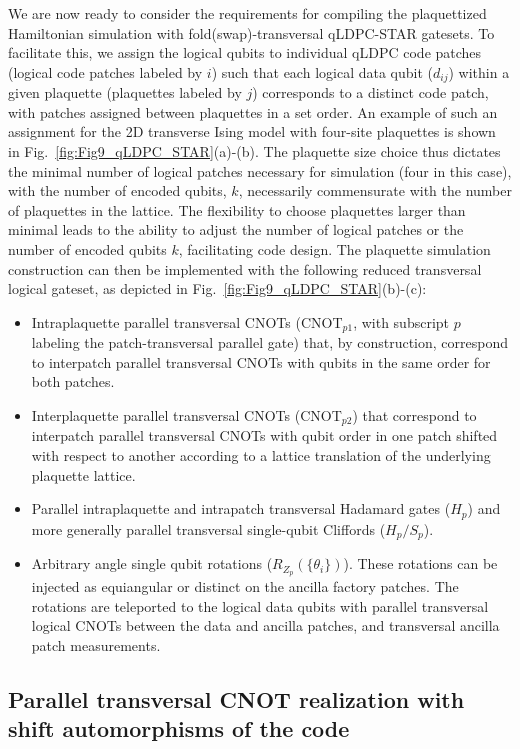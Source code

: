 \documentclass[aps, prx, reprint, superscriptaddress, longbibliography, floatfix]{revtex4-2}
\begin{document}
We are now ready to consider the requirements for compiling the plaquettized Hamiltonian simulation with fold(swap)-transversal qLDPC-STAR gatesets. To facilitate this, we assign the logical qubits to individual qLDPC code patches (logical code patches labeled by $i$) such that each logical data qubit ($d_{ij}$) within a given plaquette (plaquettes labeled by $j$) corresponds to a distinct code patch, with patches assigned between plaquettes in a set order. An example of such an assignment for the 2D transverse Ising model with four-site plaquettes is shown in Fig.~\ref{fig:Fig9_qLDPC_STAR}(a)-(b). The plaquette size choice thus dictates the minimal number of logical patches necessary for simulation (four in this case), with the number of encoded qubits, $k$, necessarily commensurate with the number of plaquettes in the lattice. The flexibility to choose plaquettes larger than minimal leads to the ability to adjust the number of logical patches or the number of encoded qubits $k$, facilitating code design. The plaquette simulation construction can then be implemented with the following reduced transversal logical gateset, as depicted in Fig.~\ref{fig:Fig9_qLDPC_STAR}(b)-(c):
\begin{itemize}
    \item Intraplaquette parallel transversal CNOTs (CNOT$_{p1}$, with subscript $p$ labeling the patch-transversal parallel gate) that, by construction, correspond to interpatch parallel transversal CNOTs with qubits in the same order for both patches.
    \item Interplaquette parallel transversal CNOTs (CNOT$_{p2}$) that correspond to interpatch parallel transversal CNOTs with qubit order in one patch shifted with respect to another according to a lattice translation of the underlying plaquette lattice.
    \item Parallel intraplaquette and intrapatch transversal Hadamard gates ($H_p$) and more generally parallel transversal single-qubit Cliffords ($H_p/S_p$).
    \item Arbitrary angle single qubit rotations ($R_{Z_p}(\{\theta_i\})$). These rotations can be injected as equiangular or distinct on the ancilla factory patches. The rotations are teleported to the logical data qubits with parallel transversal logical CNOTs between the data and ancilla patches,  and transversal ancilla patch measurements.
\end{itemize}

\subsection{Parallel transversal CNOT realization with shift automorphisms of the code}
\label{sec:qldpc_cnot}
\end{document}
